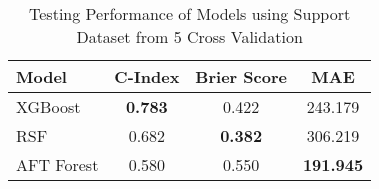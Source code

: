 \begin{table}[h!]
\centering
\caption{Testing Performance of Models using Support Dataset from 5 Cross Validation}
\label{tab:test_performance_support}
\begin{tabular}{l|c|c|c}
\hline
\textbf{Model} & \textbf{C-Index} & \textbf{Brier Score} & \textbf{MAE} \\
\hline
XGBoost & \textbf{0.783} & 0.422 & 243.179 \\
RSF & 0.682 & \textbf{0.382} & 306.219 \\
AFT Forest & 0.580 & 0.550 & \textbf{191.945} \\
\hline
\end{tabular}
\end{table}
